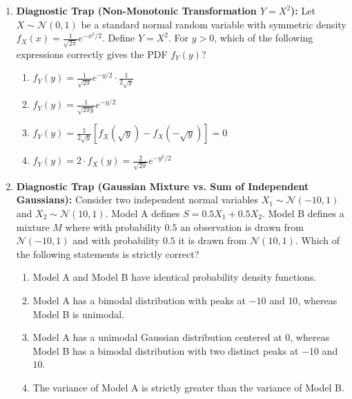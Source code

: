 \begin{enumerate}[resume]
\item \textbf{Diagnostic Trap (Non-Monotonic Transformation $Y = X^2$):}
Let $X \sim \mathcal{N}(0, 1)$ be a standard normal random variable with symmetric density $f_X(x) = \frac{1}{\sqrt{2\pi}} e^{-x^2/2}$. Define $Y = X^2$. For $y > 0$, which of the following expressions correctly gives the PDF $f_Y(y)$?
\begin{enumerate}
    \item $f_Y(y) = \frac{1}{\sqrt{2\pi}} e^{-y/2} \cdot \frac{1}{2\sqrt{y}}$
    \item $f_Y(y) = \frac{1}{\sqrt{2\pi y}} e^{-y/2}$
    \item $f_Y(y) = \frac{1}{2\sqrt{y}} \left[ f_X(\sqrt{y}) - f_X(-\sqrt{y}) \right] = 0$
    \item $f_Y(y) = 2 \cdot f_X(y) = \frac{2}{\sqrt{2\pi}} e^{-y^2/2}$
\end{enumerate}

\item \textbf{Diagnostic Trap (Gaussian Mixture vs. Sum of Independent Gaussians):}
Consider two independent normal variables $X_1 \sim \mathcal{N}(-10, 1)$ and $X_2 \sim \mathcal{N}(10, 1)$. Model A defines $S = 0.5 X_1 + 0.5 X_2$. Model B defines a mixture $M$ where with probability $0.5$ an observation is drawn from $\mathcal{N}(-10, 1)$ and with probability $0.5$ it is drawn from $\mathcal{N}(10, 1)$. Which of the following statements is strictly correct?
\begin{enumerate}
    \item Model A and Model B have identical probability density functions.
    \item Model A has a bimodal distribution with peaks at $-10$ and $10$, whereas Model B is unimodal.
    \item Model A has a unimodal Gaussian distribution centered at $0$, whereas Model B has a bimodal distribution with two distinct peaks at $-10$ and $10$.
    \item The variance of Model A is strictly greater than the variance of Model B.
\end{enumerate}
\end{enumerate}

